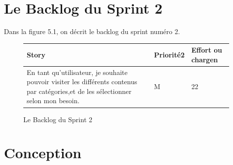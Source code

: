 \section{Le Backlog du Sprint 2}
Dans la figure 5.1, on décrit le backlog du sprint numéro 2.
\begin{figure}[H]
\begin{tabular}{|p{7cm}|p{4cm}|p{4cm}|}
\hline
\textbf{Story} & \textbf{Priorité2 } & \textbf{Effort ou chargen} \\
\hline
En tant qu'utilisateur, je souhaite pouvoir visiter les différents contenus par catégories,et de les sélectionner selon mon besoin. & \begin{center}M\end{center} & \begin{center}22\end{center}\\
\hline
\end{tabular}
  \caption{Le Backlog du Sprint 2}
  \label{fig:Backlog2}
\end{figure}
\section{Conception}
